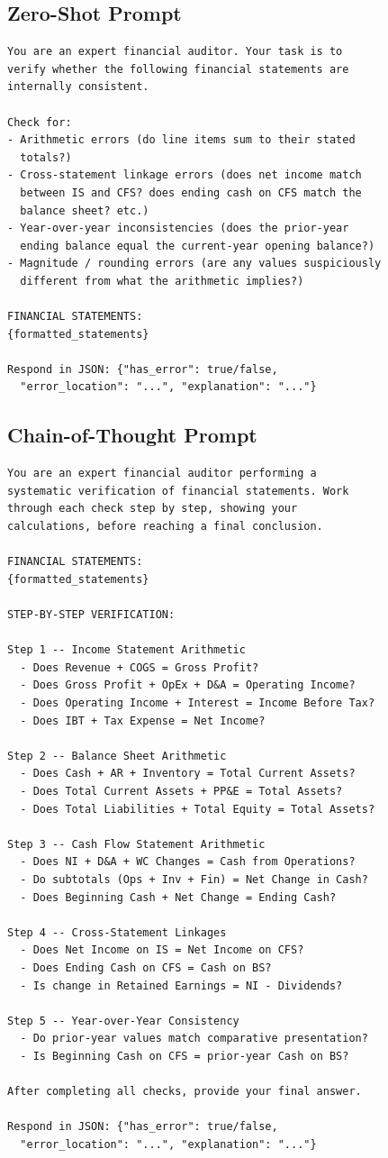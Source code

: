 \documentclass[11pt]{article}
\begin{document}
\subsection{Zero-Shot Prompt}
\begin{verbatim}
You are an expert financial auditor. Your task is to
verify whether the following financial statements are
internally consistent.

Check for:
- Arithmetic errors (do line items sum to their stated
  totals?)
- Cross-statement linkage errors (does net income match
  between IS and CFS? does ending cash on CFS match the
  balance sheet? etc.)
- Year-over-year inconsistencies (does the prior-year
  ending balance equal the current-year opening balance?)
- Magnitude / rounding errors (are any values suspiciously
  different from what the arithmetic implies?)

FINANCIAL STATEMENTS:
{formatted_statements}

Respond in JSON: {"has_error": true/false,
  "error_location": "...", "explanation": "..."}
\end{verbatim}

\subsection{Chain-of-Thought Prompt}
\begin{verbatim}
You are an expert financial auditor performing a
systematic verification of financial statements. Work
through each check step by step, showing your
calculations, before reaching a final conclusion.

FINANCIAL STATEMENTS:
{formatted_statements}

STEP-BY-STEP VERIFICATION:

Step 1 -- Income Statement Arithmetic
  - Does Revenue + COGS = Gross Profit?
  - Does Gross Profit + OpEx + D&A = Operating Income?
  - Does Operating Income + Interest = Income Before Tax?
  - Does IBT + Tax Expense = Net Income?

Step 2 -- Balance Sheet Arithmetic
  - Does Cash + AR + Inventory = Total Current Assets?
  - Does Total Current Assets + PP&E = Total Assets?
  - Does Total Liabilities + Total Equity = Total Assets?

Step 3 -- Cash Flow Statement Arithmetic
  - Does NI + D&A + WC Changes = Cash from Operations?
  - Do subtotals (Ops + Inv + Fin) = Net Change in Cash?
  - Does Beginning Cash + Net Change = Ending Cash?

Step 4 -- Cross-Statement Linkages
  - Does Net Income on IS = Net Income on CFS?
  - Does Ending Cash on CFS = Cash on BS?
  - Is change in Retained Earnings = NI - Dividends?

Step 5 -- Year-over-Year Consistency
  - Do prior-year values match comparative presentation?
  - Is Beginning Cash on CFS = prior-year Cash on BS?

After completing all checks, provide your final answer.

Respond in JSON: {"has_error": true/false,
  "error_location": "...", "explanation": "..."}
\end{verbatim}
\end{document}
